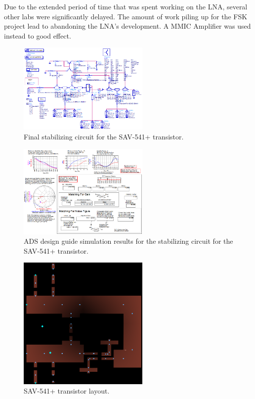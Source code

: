 \documentclass[conference]{IEEEtran}
\begin{document}
Due to the extended period of time that was spent working on the LNA, several other labs were significantly delayed. The amount of work piling up for the FSK project lead to abandoning the LNA's development. A MMIC Amplifier was used instead to good effect. 

\begin{figure}[!h]
\centering
\includegraphics[width=2.5in]{pics/FinalStabilizingCircuit.png}
\caption{Final stabilizing circuit for the SAV-541+ transistor.}
\label{fig:finalstabcircuit}
\end{figure}

\begin{figure}[!h]
\centering
\includegraphics[width=2.5in]{pics/FinalStabilizingSimulation.png}
\caption{ADS design guide simulation results for the stabilizing circuit for the SAV-541+ transistor.}
\label{fig:finalstabsimulation}
\end{figure}

\begin{figure}[!h]
\centering
\includegraphics[width=2.5in]{LNApics/LNAlayout.png}
\caption{SAV-541+ transistor layout.}
\label{fig:lnaLayout}
\end{figure}
\end{document}
